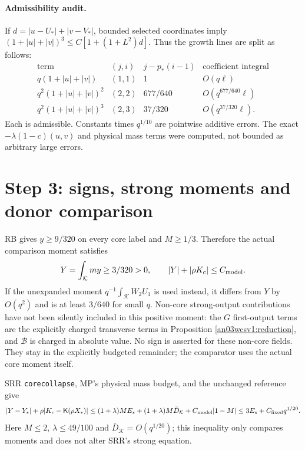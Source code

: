 \documentclass[11pt]{article}
\numberwithin{equation}{section}
\theoremstyle{remark}\newtheorem{remark}[theorem]{Remark}
\newcommand{\KK}{\mathcal K}\newcommand{\BB}{\mathcal B}
\newcommand{\Kfun}{\mathsf K}\newcommand{\Ffun}{\mathsf F}
\begin{document}
\paragraph{Admissibility audit.}
If $d=|u-U_*|+|v-V_*|$, bounded selected coordinates imply
$(1+|u|+|v|)^3\le C[1+(1+L^2)d]$. Thus the growth lines
are split as follows:
\[
\begin{array}{c|c|c|c}
\text{term}&(j,i)&j-p_*(i-1)&\text{coefficient integral}\\ \hline
q(1+|u|+|v|)&(1,1)&1&O(q\ell)\\
q^2(1+|u|+|v|)^2&(2,2)&677/640&O(q^{677/640}\ell)\\
q^2(1+|u|+|v|)^3&(2,3)&37/320&O(q^{37/320}\ell).
\end{array}
\]
Each is admissible. Constants times $q^{1/10}$ are pointwise
additive errors. The exact $-\lambda(1-c)(u,v)$ and physical
mass terms were computed, not bounded as arbitrary large errors.

\section{Step 3: signs, strong moments and donor comparison}
\label{an03wcsv1:donorsection}
RB gives $y\ge9/320$ on every core label and $M\ge1/3$.
Therefore the actual comparison moment satisfies
\begin{equation}
 Y=\int_\KK my\ge3/320>0,\qquad |Y|+|\rho K_c|\le C_{\rm model}.
 \label{an03wcsv1:Ysign}
\end{equation}
If the unexpanded moment $q^{-1}\int_\KK W_2U_1$ is used
instead, it differs from $Y$ by $O(q^2)$ and is at least
$3/640$ for small $q$. Non-core strong-output contributions
have not been silently included in this positive moment:
the $G$ first-output terms are the explicitly charged transverse
terms in Proposition \ref{an03wcsv1:reduction}, and $\BB$ is
charged in absolute value. No sign is asserted for these non-core
fields. They stay in the explicitly budgeted remainder; the
comparator uses the actual core moment itself.

SRR \texttt{corecollapse}, MP's physical mass budget, and the
unchanged reference give
\begin{equation}
 |Y-Y_*|+\rho|K_c-\Kfun(\rho X_*)|
 \le (1+\lambda)M E_s+(1+\lambda)M\bar D_\KK
                +C_{\rm model}|1-M|
 \le3E_s+C_{\rm fixed}q^{1/20}.
 \label{an03wcsv1:strongmoments}
\end{equation}
Here $M\le2$, $\lambda\le49/100$ and
$\bar D_\KK=O(q^{1/20})$; this inequality only compares moments
and does not alter SRR's strong equation.
\end{document}
